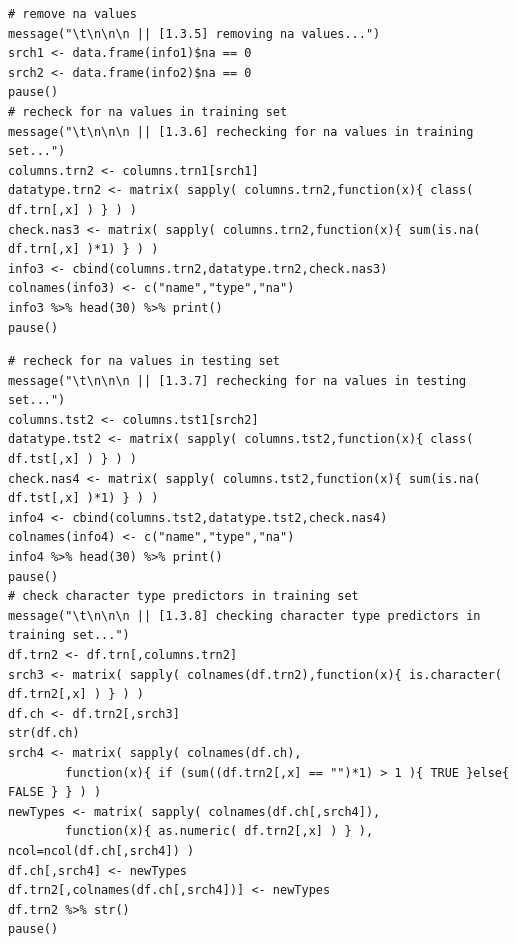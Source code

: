 \documentclass[10pt, twoside]{article}
\begin{document}
\begin{verbatim}
# remove na values
message("\t\n\n\n || [1.3.5] removing na values...")
srch1 <- data.frame(info1)$na == 0
srch2 <- data.frame(info2)$na == 0
pause()
# recheck for na values in training set
message("\t\n\n\n || [1.3.6] rechecking for na values in training set...")
columns.trn2 <- columns.trn1[srch1]
datatype.trn2 <- matrix( sapply( columns.trn2,function(x){ class( df.trn[,x] ) } ) )
check.nas3 <- matrix( sapply( columns.trn2,function(x){ sum(is.na( df.trn[,x] )*1) } ) )
info3 <- cbind(columns.trn2,datatype.trn2,check.nas3)
colnames(info3) <- c("name","type","na")
info3 %>% head(30) %>% print()
pause()
\end{verbatim}

\begin{verbatim}
# recheck for na values in testing set
message("\t\n\n\n || [1.3.7] rechecking for na values in testing set...")
columns.tst2 <- columns.tst1[srch2]
datatype.tst2 <- matrix( sapply( columns.tst2,function(x){ class( df.tst[,x] ) } ) )
check.nas4 <- matrix( sapply( columns.tst2,function(x){ sum(is.na( df.tst[,x] )*1) } ) )
info4 <- cbind(columns.tst2,datatype.tst2,check.nas4)
colnames(info4) <- c("name","type","na")
info4 %>% head(30) %>% print()
pause()
# check character type predictors in training set
message("\t\n\n\n || [1.3.8] checking character type predictors in training set...")
df.trn2 <- df.trn[,columns.trn2]
srch3 <- matrix( sapply( colnames(df.trn2),function(x){ is.character( df.trn2[,x] ) } ) )
df.ch <- df.trn2[,srch3]
str(df.ch)
srch4 <- matrix( sapply( colnames(df.ch),
        function(x){ if (sum((df.trn2[,x] == "")*1) > 1 ){ TRUE }else{ FALSE } } ) )
newTypes <- matrix( sapply( colnames(df.ch[,srch4]),
        function(x){ as.numeric( df.trn2[,x] ) } ), ncol=ncol(df.ch[,srch4]) )
df.ch[,srch4] <- newTypes
df.trn2[,colnames(df.ch[,srch4])] <- newTypes
df.trn2 %>% str()
pause()
\end{verbatim}
\end{document}
